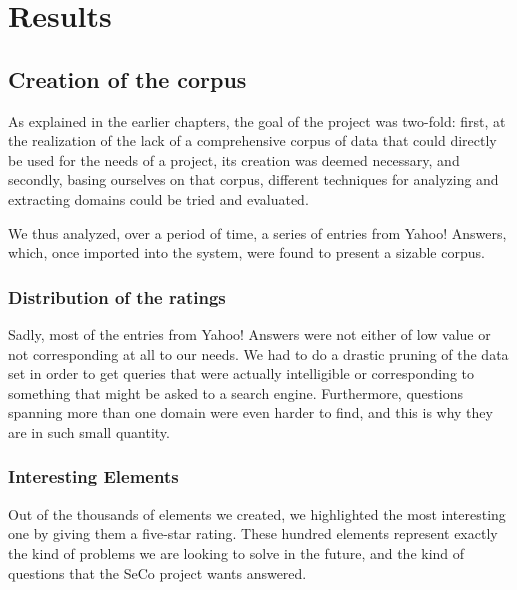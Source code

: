 \chapter{Results} %
\label{cha:results}

\section{Creation of the corpus} %
\label{sec:creation_of_the_corpus_results}

As explained in the earlier chapters, the goal of the project was two-fold: first, at the realization of the lack of a comprehensive corpus of data that could directly be used for the needs of a project, its creation was deemed necessary, and secondly, basing ourselves on that corpus, different techniques for analyzing and extracting domains could be tried and evaluated.

We thus analyzed, over a period of time, a series of entries from Yahoo! Answers, which, once imported into the system, were found to present a sizable corpus.

\subsection{Distribution of the ratings} %
\label{sub:distribution_of_the_ratings}

Sadly, most of the entries from Yahoo! Answers were not either of low value or not corresponding at all to our needs. We had to do a drastic pruning of the data set in order to get queries that were actually intelligible or corresponding to something that might be asked to a search engine. Furthermore, questions spanning more than one domain were even harder to find, and this is why they are in such small quantity.


\subsection{Interesting Elements} %
\label{sub:interesting_elements}

Out of the thousands of elements we created, we highlighted the most interesting one by giving them a five-star rating. These hundred elements represent exactly the kind of problems we are looking to solve in the future, and the kind of questions that the SeCo project wants answered.



